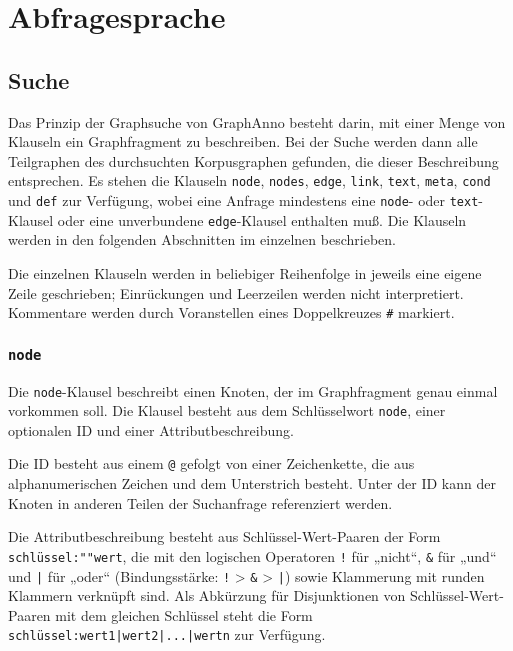 \documentclass[12pt]{scrartcl}
\begin{document}
\section{Abfragesprache}

\subsection{Suche}

Das Prinzip der Graphsuche von GraphAnno besteht darin, mit einer Menge von Klauseln ein Graphfragment zu beschreiben. Bei der Suche werden dann alle Teilgraphen des durchsuchten Korpusgraphen gefunden, die dieser Beschreibung entsprechen.
Es stehen die Klauseln \texttt{node}, \texttt{nodes}, \texttt{edge}, \texttt{link}, \texttt{text}, \texttt{meta}, \texttt{cond} und \texttt{def} zur Verfügung, wobei eine Anfrage mindestens eine \texttt{node}- oder \texttt{text}-Klausel oder eine unverbundene \texttt{edge}-Klausel enthalten muß. Die Klauseln werden in den folgenden Abschnitten im einzelnen beschrieben.

Die einzelnen Klauseln werden in beliebiger Reihenfolge in jeweils eine eigene Zeile geschrieben; Einrückungen und Leerzeilen werden nicht interpretiert. Kommentare werden durch Voranstellen eines Doppelkreuzes \texttt{\#} markiert.



\subsubsection{\texttt{node}}\label{node}

Die \texttt{node}-Klausel beschreibt einen Knoten, der im Graphfragment genau einmal vorkommen soll. Die Klausel besteht aus dem Schlüsselwort \texttt{node}, einer optionalen ID und einer Attributbeschreibung.

Die ID besteht aus einem \texttt{@} gefolgt von einer Zeichenkette, die aus alphanumerischen Zeichen und dem Unterstrich besteht. Unter der ID kann der Knoten in anderen Teilen der Suchanfrage referenziert werden.

Die Attributbeschreibung besteht aus Schlüssel-Wert-Paaren der Form \texttt{schlüssel:""wert}, die mit den logischen Operatoren \texttt{!} für „nicht“, \texttt{\&} für „und“ und \texttt{|} für „oder“ (Bindungsstärke: \texttt{!} > \texttt{\&} > \texttt{|}) sowie Klammerung mit runden Klammern verknüpft sind. Als Abkürzung für Disjunktionen von Schlüssel-Wert-Paaren mit dem gleichen Schlüssel steht die Form \texttt{schlüssel:wert1|wert2|...|wertn} zur Verfügung.
\end{document}
